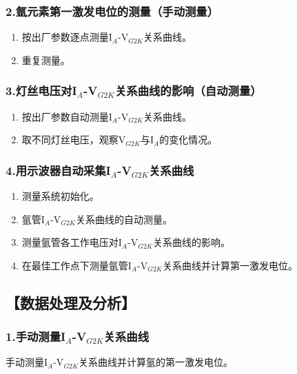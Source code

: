 \documentclass[12pt,a4paper,UTF8]{ctexart}
\begin{document}
	\subsubsection*{2.氩元素第一激发电位的测量（手动测量）}
	\begin{enumerate}[(1)]
		\item 按出厂参数逐点测量I$_A$-V$_{G2K}$关系曲线。
		\item 重复测量。
	\end{enumerate}

	\subsubsection*{3.灯丝电压对I$_A$-V$_{G2K}$关系曲线的影响（自动测量）}
	\begin{enumerate}[(1)]
		\item 按出厂参数自动测量I$_A$-V$_{G2K}$关系曲线。
		\item 取不同灯丝电压，观察V$_{G2K}$与I$_A$的变化情况。
	\end{enumerate}

	\subsubsection*{4.用示波器自动采集I$_A$-V$_{G2K}$关系曲线}
	\begin{enumerate}[(1)]
		\item 测量系统初始化。
		\item 氩管I$_A$-V$_{G2K}$关系曲线的自动测量。
		\item 测量氩管各工作电压对I$_A$-V$_{G2K}$关系曲线的影响。
		\item 在最佳工作点下测量氩管I$_A$-V$_{G2K}$关系曲线并计算第一激发电位。
	\end{enumerate}


\subsection*{【数据处理及分析】}
	\subsubsection*{1.手动测量I$_{A}$-V$_{G2K}$关系曲线}

    手动测量I$_{A}$-V$_{G2K}$关系曲线并计算氩的第一激发电位。
\end{document}
